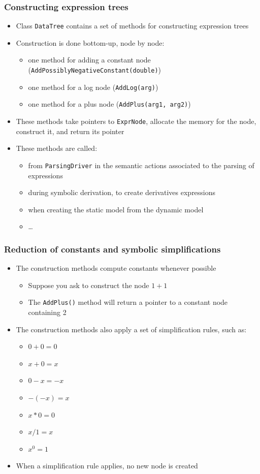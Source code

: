 \documentclass{beamer}
\begin{document}
\begin{frame}
  \frametitle{Constructing expression trees}
  \begin{itemize}
  \item Class \texttt{DataTree} contains a set of methods for constructing expression trees
  \item Construction is done bottom-up, node by node:
    \begin{itemize}
    \item one method for adding a constant node (\texttt{AddPossiblyNegativeConstant(double)})
    \item one method for a log node (\texttt{AddLog(arg)})
    \item one method for a plus node (\texttt{AddPlus(arg1, arg2)})
    \end{itemize}
  \item These methods take pointers to \texttt{ExprNode}, allocate the memory for the node, construct it, and return its pointer
  \item These methods are called:
    \begin{itemize}
    \item from \texttt{ParsingDriver} in the semantic actions associated to the parsing of expressions
    \item during symbolic derivation, to create derivatives expressions
    \item when creating the static model from the dynamic model
    \item \ldots
    \end{itemize}
  \end{itemize}
\end{frame}

\begin{frame}
  \frametitle{Reduction of constants and symbolic simplifications}
  \begin{itemize}
  \item The construction methods compute constants whenever possible
    \begin{itemize}
    \item Suppose you ask to construct the node $1+1$
    \item The \texttt{AddPlus()} method will return a pointer to a constant node containing 2
    \end{itemize}
  \item The construction methods also apply a set of simplification rules, such as:
    \begin{itemize}
    \item $0+0=0$
    \item $x+0 = x$
    \item $0-x = -x$
    \item $-(-x) = x$
    \item $x*0 = 0$
    \item $x/1 = x$
    \item $x^0 = 1$
    \end{itemize}
  \item When a simplification rule applies, no new node is created
  \end{itemize}
\end{frame}
\end{document}
